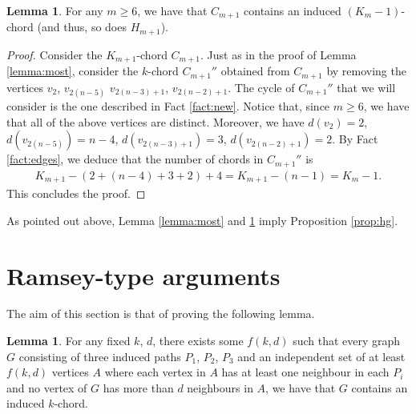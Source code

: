 \documentclass[12pt]{article}
\theoremstyle{definition}
\newtheorem{lemma}[thm]{Lemma}
\begin{document}
    \begin{lemma} \label{lemma:remainder}
        For any $m \geq 6$, we have that $C_{m+1}$ contains
        an induced $\left(K_{m} - 1\right)$-chord
        (and thus, so does $H_{m+1}$).
    \end{lemma}
    \begin{proof}
        Consider the $K_{m+1}$-chord $C_{m+1}$.
        Just as in the proof of Lemma \ref{lemma:most},
        consider the $k$-chord $C_{m+1}''$ obtained
        from $C_{m+1}$ by removing the vertices
        $v_2$, $v_{2\left(n-5\right)}$
        $v_{2\left(n-3\right)+1}$, $v_{2\left(n-2\right)+1}$.
        The cycle of $C_{m+1}''$ that
        we will consider is the one
        described in Fact \ref{fact:new}.
        Notice that, since $m \geq 6$, we have
        that all of the above vertices
        are distinct. Moreover, we have
        $d\left(v_2\right) = 2$, 
        $d\left(v_{2\left(n-5\right)}\right) = n-4$,
        $d\left(v_{2\left(n-3\right)+1}\right)=3$,
        $d\left(v_{2\left(n-2\right)+1}\right) = 2$.
        By Fact \ref{fact:edges}, 
        we deduce that the number of chords
        in $C_{m+1}''$ is
        \begin{gather*}
            K_{m+1} - \left(2 + \left(n-4\right)
            + 3 + 2\right) + 4 =
            K_{m+1} - \left(n-1\right) = K_{m} -1.
        \end{gather*}
        This concludes the proof.
    \end{proof}

    As pointed out above, Lemma
    \ref{lemma:most} and \ref{lemma:remainder}
    imply Proposition \ref{prop:hg}.

    \section{Ramsey-type arguments}

    The aim of this section is that of
    proving the following lemma.

    \begin{lemma} \label{lemma:paths}
        For any fixed $k$, $d$,
        there exists some $f\left(k, d\right)$ 
        such that every graph $G$
        consisting of three induced
        paths $P_1$, $P_2$, $P_3$ 
        and an independent set of at least
        $f\left(k, d\right)$ vertices $A$ 
        where each vertex in $A$ has
        at least one neighbour in each $P_{i}$
        and no vertex of $G$ has more
        than $d$ neighbours in $A$,
        we have that $G$ contains an
        induced $k$-chord.
    \end{lemma}
\end{document}

